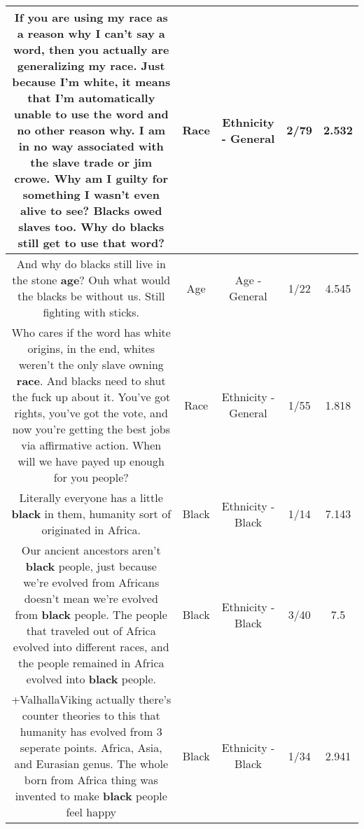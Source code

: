 \documentclass[11pt]{article}
\newlength\mylength
\begin{document}
\begin{center}
\begin{longtable}{|C{.65\mylength}|C{.30\mylength}|C{.12\mylength}|C{.12\mylength}|C{.12\mylength}|}
  \small If you are using my \textbf{race} as a reason why I can't say a word, then you actually are generalizing my \textbf{race}. Just because I'm white, it means that I'm automatically unable to use the word and no other reason why. I am in no way associated with the slave trade or jim crowe. Why am I guilty for something I wasn't even alive to see? Blacks owed slaves too. Why do blacks still get to use that word?\normalsize   & Race & Ethnicity - General & 2/79 & 2.532 \\  \hline
  \small And why do blacks still live in the stone \textbf{age}? Ouh what would the blacks be without us. Still fighting with sticks.\normalsize   & Age & Age - General & 1/22 & 4.545 \\  \hline
  \small Who cares if the word has white origins, in the end, whites weren't the only slave owning \textbf{race}. And blacks need to shut the fuck up about it. You've got rights, you've got the vote, and now you're getting the best jobs via affirmative action. When will we have payed up enough for you people?\normalsize   & Race & Ethnicity - General & 1/55 & 1.818 \\  \hline
  \small Literally everyone has a little \textbf{black} in them, humanity sort of originated in Africa.\normalsize   & Black & Ethnicity - Black & 1/14 & 7.143 \\  \hline
  \small Our ancient ancestors aren't \textbf{black} people, just because we're evolved from Africans doesn't mean we're evolved from \textbf{black} people. The people that traveled out of Africa evolved into different races, and the people remained in Africa evolved into \textbf{black} people.\normalsize   & Black & Ethnicity - Black & 3/40 & 7.5 \\  \hline
  \small +ValhallaViking actually there's counter theories to this that humanity has evolved from 3 seperate points. Africa, Asia, and Eurasian genus. The whole born from Africa thing was invented to make \textbf{black} people feel happy\normalsize   & Black & Ethnicity - Black & 1/34 & 2.941 \\  \hline

\end{longtable}
\end{center}
\end{document}
